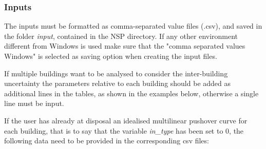 \subsubsection{Inputs}
\label{subsubsec:InputSpo2ida}
The inputs must be formatted as comma-separated value files (.csv), and saved in the folder \textit{input}, contained in the NSP directory. If any other environment different from Windows is used make sure that the "comma separated values Windows" is selected as saving option when creating the input files. 

If multiple buildings want to be analysed to consider the inter-building uncertainty the parameters relative to each building should be added as additional lines in the tables, as shown in the examples below, otherwise a single line must be input.

If the user has already at disposal an idealised multilinear pushover curve for each building, that is to say that the variable \textit{in\_type} has been set to 0, the following data need to be provided in the corresponding csv files:

